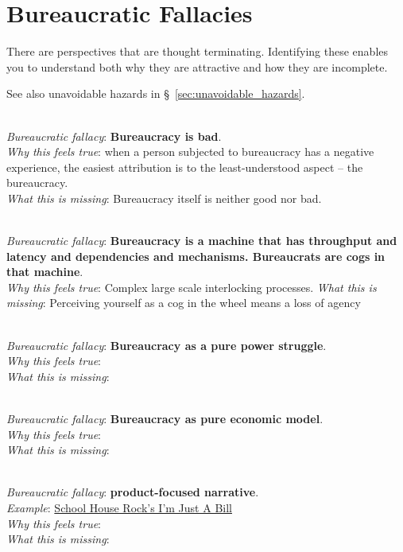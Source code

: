 \section{Bureaucratic Fallacies\label{sec:fallacies}}

There are perspectives that are \gls{thought terminating}. Identifying these enables you to understand both why they are attractive and how they are incomplete.

See also unavoidable hazards in \S~\ref{sec:unavoidable_hazards}.

\ \\

\textit{Bureaucratic fallacy}: \textbf{Bureaucracy is bad}. \\
\textit{Why this feels true}: when a person subjected to bureaucracy has a negative experience, the easiest attribution is to the least-understood aspect -- the bureaucracy.\\
\textit{What this is missing}: Bureaucracy itself is neither good nor bad. 

\ \\

\textit{Bureaucratic fallacy}: \textbf{Bureaucracy is a machine that has throughput and latency and dependencies and mechanisms. Bureaucrats are cogs in that machine}.\\
\textit{Why this feels true}: Complex large scale interlocking processes.
\textit{What this is missing}: Perceiving yourself as a cog in the wheel means a loss of agency

\ \\

\textit{Bureaucratic fallacy}: \textbf{Bureaucracy as a pure power struggle}. \\
\textit{Why this feels true}: \\
\textit{What this is missing}: 

\ \\

\textit{Bureaucratic fallacy}: \textbf{Bureaucracy as pure economic model}. \\
\textit{Why this feels true}: \\
\textit{What this is missing}: 

\ \\ 

\textit{Bureaucratic fallacy}: \textbf{product-focused narrative}. \\
\textit{Example}: \href{https://www.youtube.com/watch?v=OgVKvqTItto}{School House Rock's I'm Just A Bill}\\
\textit{Why this feels true}: \\
\textit{What this is missing}: 

